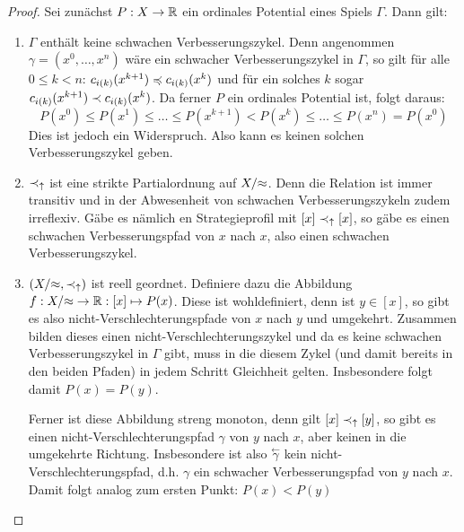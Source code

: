 \begin{proof}
	Sei zunächst $P: X \to \mathbb{R}$ ein ordinales Potential eines Spiels $\Gamma$. Dann gilt:
	\begin{enumerate}
		\item $\Gamma$ enthält keine schwachen Verbesserungszykel. Denn angenommen $\gamma = (x^0, \dots, x^n)$ wäre ein schwacher Verbesserungszykel in $\Gamma$, so gilt für alle $0 \leq k < n$: $c_{i(k)}(x^{k+1}) \preccurlyeq c_{i(k)}(x^k)$ und für ein solches $k$ sogar $c_{i(k)}(x^{k+1}) \prec c_{i(k)}(x^k)$. Da ferner $P$ ein ordinales Potential ist, folgt daraus:
			\[P(x^0) \leq P(x^1) \leq \dots \leq P(x^{k+1}) < P(x^k) \leq \dots \leq P(x^n) = P(x^0)\]
		Dies ist jedoch ein Widerspruch. Also kann es keinen solchen Verbesserungszykel geben.
		
		\item $\prec_\uparrow$ ist eine strikte Partialordnung auf $X/{\approx}$. Denn die Relation ist immer transitiv und in der Abwesenheit von schwachen Verbesserungszykeln zudem irreflexiv. Gäbe es nämlich en Strategieprofil mit $[x] \prec_\uparrow [x]$, so gäbe es einen schwachen Verbesserungspfad von $x$ nach $x$, also einen schwachen Verbesserungszykel.
		
		\item $(X/{\approx}, \prec_\uparrow)$ ist reell geordnet. Definiere dazu die Abbildung $f: X/{\approx} \to \mathbb{R}: [x] \mapsto P(x)$. Diese ist wohldefiniert, denn ist $y \in [x]$, so gibt es also nicht-Verschlechterungspfade von $x$ nach $y$ und umgekehrt. Zusammen bilden dieses einen nicht-Verschlechterungszykel und da es keine schwachen Verbesserungszykel in $\Gamma$ gibt, muss in die diesem Zykel (und damit bereits in den beiden Pfaden) in jedem Schritt Gleichheit gelten. Insbesondere folgt damit $P(x) = P(y)$.
		
		Ferner ist diese Abbildung streng monoton, denn gilt $[x] \prec_\uparrow [y]$, so gibt es einen nicht-Verschlechterungspfad $\gamma$ von $y$ nach $x$, aber keinen in die umgekehrte Richtung. Insbesondere ist also $\overset{\leftarrow}{\gamma}$ kein nicht-Verschlechterungspfad, d.h. $\gamma$ ein schwacher Verbesserungspfad von $y$ nach $x$. Damit folgt analog zum ersten Punkt: $P(x) < P(y)$
	\end{enumerate}


\end{proof}
